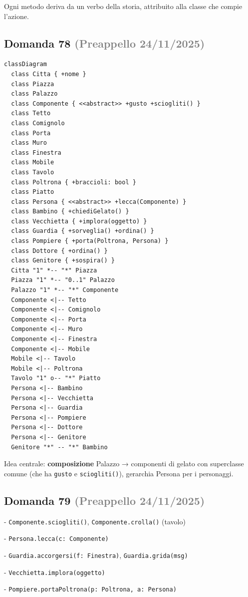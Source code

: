 \documentclass[a4paper,11pt]{article}
\begin{document}
Ogni metodo deriva da un verbo della storia, attribuito alla classe che compie l'azione.



\subsection*{Domanda 78 \hfill {\small \textcolor{gray}{(Preappello 24/11/2025)}}}


\begin{verbatim}
classDiagram
  class Citta { +nome }
  class Piazza
  class Palazzo
  class Componente { <<abstract>> +gusto +sciogliti() }
  class Tetto
  class Comignolo
  class Porta
  class Muro
  class Finestra
  class Mobile
  class Tavolo
  class Poltrona { +braccioli: bool }
  class Piatto
  class Persona { <<abstract>> +lecca(Componente) }
  class Bambino { +chiediGelato() }
  class Vecchietta { +implora(oggetto) }
  class Guardia { +sorveglia() +ordina() }
  class Pompiere { +porta(Poltrona, Persona) }
  class Dottore { +ordina() }
  class Genitore { +sospira() }
  Citta "1" *-- "*" Piazza
  Piazza "1" *-- "0..1" Palazzo
  Palazzo "1" *-- "*" Componente
  Componente <|-- Tetto
  Componente <|-- Comignolo
  Componente <|-- Porta
  Componente <|-- Muro
  Componente <|-- Finestra
  Componente <|-- Mobile
  Mobile <|-- Tavolo
  Mobile <|-- Poltrona
  Tavolo "1" o-- "*" Piatto
  Persona <|-- Bambino
  Persona <|-- Vecchietta
  Persona <|-- Guardia
  Persona <|-- Pompiere
  Persona <|-- Dottore
  Persona <|-- Genitore
  Genitore "*" -- "*" Bambino
\end{verbatim}
Idea centrale: \textbf{composizione} Palazzo → componenti di gelato con superclasse comune (che ha \texttt{gusto} e \texttt{sciogliti()}), gerarchia Persona per i personaggi.



\subsection*{Domanda 79 \hfill {\small \textcolor{gray}{(Preappello 24/11/2025)}}}
- \texttt{Componente.sciogliti()}, \texttt{Componente.crolla()} (tavolo)

- \texttt{Persona.lecca(c: Componente)}

- \texttt{Guardia.accorgersi(f: Finestra)}, \texttt{Guardia.grida(msg)}

- \texttt{Vecchietta.implora(oggetto)}

- \texttt{Pompiere.portaPoltrona(p: Poltrona, a: Persona)}
\end{document}
